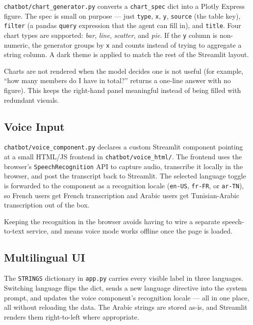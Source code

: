 \documentclass[12pt, a4paper]{report}
\begin{document}
\texttt{chatbot/chart\_generator.py} converts a \texttt{chart\_spec} dict
into a Plotly Express figure. The spec is small on purpose --- just
\texttt{type}, \texttt{x}, \texttt{y}, \texttt{source} (the table key),
\texttt{filter} (a pandas \texttt{query} expression that the agent can
fill in), and \texttt{title}. Four chart types are supported:
\textit{bar}, \textit{line}, \textit{scatter}, and \textit{pie}. If the
\texttt{y} column is non-numeric, the generator groups by \texttt{x} and
counts instead of trying to aggregate a string column. A dark theme is
applied to match the rest of the Streamlit layout.

Charts are not rendered when the model decides one is not useful (for
example, ``how many members do I have in total?'' returns a one-line
answer with no figure). This keeps the right-hand panel meaningful
instead of being filled with redundant visuals.

\subsection{Voice Input}

\texttt{chatbot/voice\_component.py} declares a custom Streamlit
component pointing at a small HTML/JS frontend in
\texttt{chatbot/voice\_html/}. The frontend uses the browser's
\texttt{SpeechRecognition} API to capture audio, transcribe it locally
in the browser, and post the transcript back to Streamlit. The selected
language toggle is forwarded to the component as a recognition locale
(\texttt{en-US}, \texttt{fr-FR}, or \texttt{ar-TN}), so French users
get French transcription and Arabic users get Tunisian-Arabic
transcription out of the box.

Keeping the recognition in the browser avoids having to wire a separate
speech-to-text service, and means voice mode works offline once the page
is loaded.

\subsection{Multilingual UI}

The \texttt{STRINGS} dictionary in \texttt{app.py} carries every visible
label in three languages. Switching language flips the dict, sends a new
language directive into the system prompt, and updates the voice
component's recognition locale --- all in one place, all without
reloading the data. The Arabic strings are stored as-is, and Streamlit
renders them right-to-left where appropriate.
\end{document}
